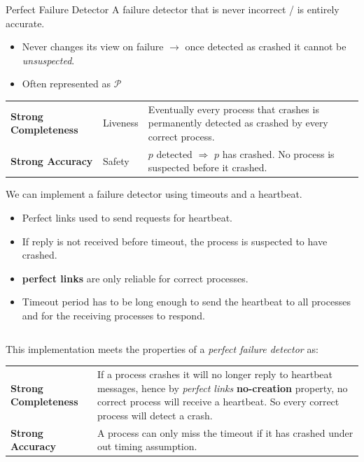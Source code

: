 \begin{definitionbox}{Perfect Failure Detector}
  A failure detector that is never incorrect / is entirely accurate.
  \begin{itemize}
    \item Never changes its view on failure $\to$ once detected as crashed it cannot be \textit{unsuspected}.
    \item Often represented as $\mathcal{P}$
  \end{itemize}
  \begin{center}
    \begin{tabular}{l l p{}}
      \textbf{Strong Completeness} & Liveness & Eventually every process that crashes is permanently detected as crashed by every correct process. \\
      \textbf{Strong Accuracy} & Safety & $p$ detected $\Rightarrow$ $p$ has crashed. No process is suspected before it crashed. \\
    \end{tabular}
\end{center}
\end{definitionbox}

We can implement a failure detector using timeouts and a heartbeat.
\begin{itemize}
  \item Perfect links used to send requests for heartbeat.
  \item If reply is not received before timeout, the process is suspected to have crashed.
  \item \textbf{perfect links} are only reliable for correct processes.
  \item Timeout period has to be long enough to send the heartbeat to all processes and for the receiving processes to respond. 
\end{itemize} 
\inputminted{elixir}{broadcast/code/perfect_failure_detector.ex}

This implementation meets the properties of a \textit{perfect failure detector} as:
\begin{center}
  \begin{tabular}{l p{}}
    \textbf{Strong Completeness} & {If a process crashes it will no longer reply to heartbeat messages, 
    hence by \textit{perfect links} \textbf{no-creation} property, no correct process will receive 
    a heartbeat. So every correct process will detect a crash. } \\
    \textbf{Strong Accuracy} & A process can only miss the timeout if it has crashed under out timing assumption.
  \end{tabular}
\end{center}

